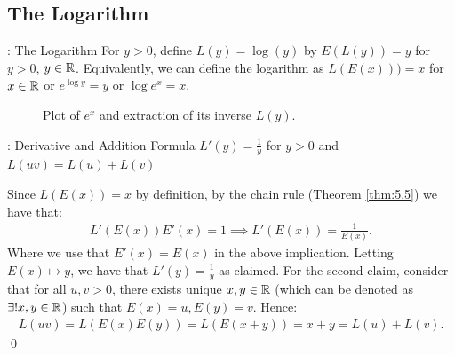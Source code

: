 \subsection{The Logarithm}
\begin{ndef}{: The Logarithm}{}
    For $y > 0$, define $L(y) = \log(y)$ by $E(L(y)) = y$ for $y > 0$, $y \in \mathbb{R}$. Equivalently, we can define the logarithm as $L(E(x))) = x$ for $x \in \mathbb{R}$ or $e^{\log y} = y$ or $\log e^x = x$. 
\end{ndef}
\begin{figure}[htbp]
    \centering

    \caption{Plot of $e^x$ and extraction of its inverse $L(y)$.}
    \label{fig53}
\end{figure}

\begin{ntheorem}{: Derivative and Addition Formula}{}
    $L'(y) = \frac{1}{y}$ for $y > 0$ and $L(uv) = L(u) + L(v)$
\end{ntheorem}
\begin{nproof}
    Since $L(E(x)) = x$ by definition, by the chain rule (Theorem \ref{thm:5.5}) we have that:
    \begin{align*}
        L'(E(x))E'(x) = 1 \implies L'(E(x)) = \frac{1}{E(x)}.
    \end{align*}
    Where we use that $E'(x) = E(x)$ in the above implication. Letting $E(x) \mapsto y$, we have that $L'(y) = \frac{1}{y}$ as claimed. For the second claim, consider that for all $u, v > 0$, there exists unique $x, y \in \mathbb{R}$ (which can be denoted as $\exists ! x, y \in \mathbb{R}$) such that $E(x) = u, E(y) = v$. Hence:
    \begin{align*}
        L(uv) = L(E(x)E(y)) = L(E(x + y)) = x + y = L(u) + L(v).
    \end{align*}\qed
\end{nproof}

